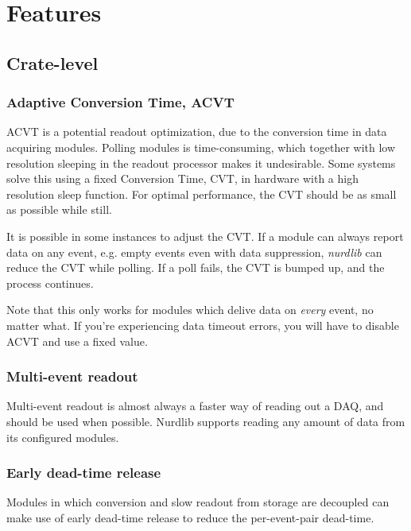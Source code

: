 \documentclass{article}
\begin{document}
\section{Features}



\subsection{Crate-level}


\subsubsection{Adaptive Conversion Time, ACVT}

ACVT is a potential readout optimization, due to the conversion time in data
acquiring modules. Polling modules is time-consuming, which together with low
resolution sleeping in the readout processor makes it undesirable. Some
systems solve this using a fixed Conversion Time, CVT, in hardware with a high
resolution sleep function. For optimal performance, the CVT should be as small
as possible while still.

It is possible in some instances to adjust the CVT. If a module can always
report data on any event, e.g. empty events even with data suppression,
\emph{nurdlib} can reduce the CVT while polling. If a poll fails, the CVT is
bumped up, and the process continues.

Note that this only works for modules which delive data on \emph{every} event,
no matter what. If you're experiencing data timeout errors, you will have to
disable ACVT and use a fixed value.


\subsubsection{Multi-event readout}

Multi-event readout is almost always a faster way of reading out a DAQ, and
should be used when possible. Nurdlib supports reading any amount of data from
its configured modules.


\subsubsection{Early dead-time release}

Modules in which conversion and slow readout from storage are decoupled can
make use of early dead-time release to reduce the per-event-pair dead-time.
\end{document}
